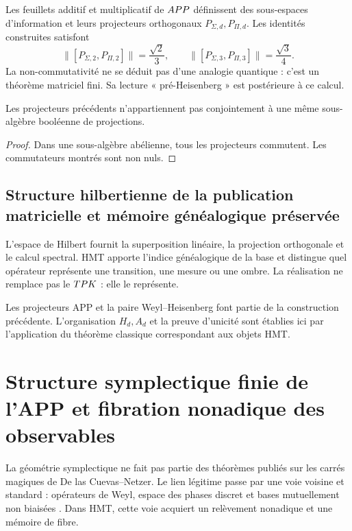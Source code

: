 Les feuillets additif et multiplicatif de \(APP\) définissent des sous-espaces
d’information et leurs projecteurs orthogonaux
\(P_{\Sigma,d},P_{\Pi,d}\). Les identités construites satisfont
\[
 \|[P_{\Sigma,2},P_{\Pi,2}]\|
 =\frac{\sqrt2}{3},
 \qquad
 \|[P_{\Sigma,3},P_{\Pi,3}]\|
 =\frac{\sqrt3}{4}.
\]
La non-commutativité ne se déduit pas d’une analogie quantique : c’est un théorème
matriciel fini. Sa lecture « pré-Heisenberg » est postérieure à ce calcul.

\begin{proposition}
Les projecteurs précédents n’appartiennent pas conjointement à une même
sous-algèbre booléenne de projections.
\end{proposition}

\begin{proof}
Dans une sous-algèbre abélienne, tous les projecteurs commutent. Les commutateurs
montrés sont non nuls.
\end{proof}

\subsection{Structure hilbertienne de la publication matricielle et mémoire généalogique préservée}

L’espace de Hilbert fournit la superposition linéaire, la projection orthogonale
et le calcul spectral. HMT apporte l’indice généalogique de la base et distingue
quel opérateur représente une transition, une mesure ou une ombre. La
réalisation ne remplace pas le \(TPK\) : elle le représente.

\begin{sourcebox}
Les projecteurs APP et la paire Weyl--Heisenberg font partie de la construction
précédente. L’organisation \(H_d,A_d\) et la preuve d’unicité sont établies
ici par l’application du théorème classique correspondant aux objets
HMT.
\end{sourcebox}


\section{Structure symplectique finie de l’APP et fibration nonadique des observables}
\label{p12-83-c2-s4:gmc:chap:simplectica}

La géométrie symplectique ne fait pas partie des théorèmes publiés sur
les carrés magiques de De las Cuevas--Netzer. Le lien légitime passe par une
voie voisine et standard : opérateurs de Weyl, espace des phases discret et
bases mutuellement non biaisées \citep{gibbons2004phase,planat2007rings}. Dans HMT,
cette voie acquiert un relèvement nonadique et une mémoire de fibre.

